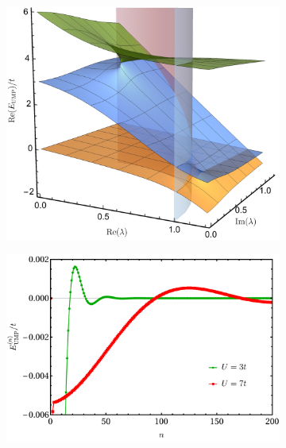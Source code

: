 \documentclass[aps,prb,reprint,noshowkeys,superscriptaddress]{revtex4-1}
\begin{document}
\begin{figure}
	\begin{subfigure}{0.32\textwidth}
	\includegraphics[height=0.75\textwidth]{fig3a}	
    \end{subfigure}
    \begin{subfigure}{0.32\textwidth}
	\includegraphics[height=0.75\textwidth]{fig3b}
		\subcaption{\label{subfig:UMP_cvg}}
    \end{subfigure}
    \begin{subfigure}{0.32\textwidth}

\end{subfigure}
\end{figure}
\end{document}
